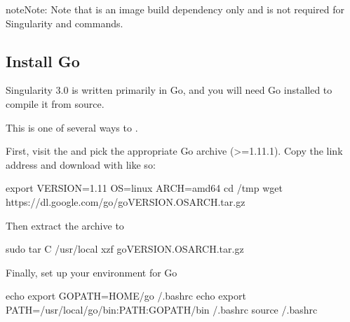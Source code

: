 \documentclass[letterpaper,10pt,english]{sphinxmanual}
\begin{document}
\begin{sphinxadmonition}{note}{Note:}
Note that  is an image build dependency only and is not required for Singularity  and  commands.
\end{sphinxadmonition}


\subsection{Install Go}
\label{\detokenize{quick_start:install-go}}
Singularity 3.0 is written primarily in Go, and you will need Go installed to
compile it from source.

This is one of several ways to .

First, visit the  and pick the
appropriate Go archive (\textgreater{}=1.11.1). Copy the link address and download
with  like so:

%
\begin{sphinxVerbatim}[commandchars=\\\{\}]
\PYGZdl{} export VERSION=1.11 OS=linux ARCH=amd64
\PYGZdl{} cd /tmp
\PYGZdl{} wget https://dl.google.com/go/go\PYGZdl{}VERSION.\PYGZdl{}OS\PYGZhy{}\PYGZdl{}ARCH.tar.gz
\end{sphinxVerbatim}

Then extract the archive to 

%
\begin{sphinxVerbatim}[commandchars=\\\{\}]
\PYGZdl{} sudo tar \PYGZhy{}C /usr/local \PYGZhy{}xzf go\PYGZdl{}VERSION.\PYGZdl{}OS\PYGZhy{}\PYGZdl{}ARCH.tar.gz
\end{sphinxVerbatim}

Finally, set up your environment for Go

%
\begin{sphinxVerbatim}[commandchars=\\\{\}]
\PYGZdl{} echo \PYGZsq{}export GOPATH=\PYGZdl{}\PYGZob{}HOME\PYGZcb{}/go\PYGZsq{} \PYGZgt{}\PYGZgt{} \PYGZti{}/.bashrc
\PYGZdl{} echo \PYGZsq{}export PATH=/usr/local/go/bin:\PYGZdl{}\PYGZob{}PATH\PYGZcb{}:\PYGZdl{}\PYGZob{}GOPATH\PYGZcb{}/bin\PYGZsq{} \PYGZgt{}\PYGZgt{} \PYGZti{}/.bashrc
\PYGZdl{} source \PYGZti{}/.bashrc
\end{sphinxVerbatim}
\end{document}
